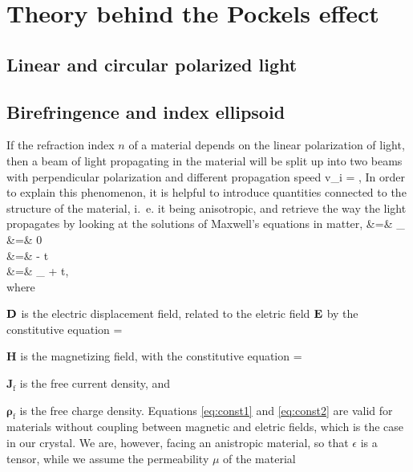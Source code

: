 \section{Theory behind the Pockels effect}

\subsection{Linear and circular polarized light}

\subsection{Birefringence and index ellipsoid}
If the refraction index $n$ of a material depends on the linear polarization of light, 
then a beam of light propagating in the material will be split up into 
two beams with perpendicular polarization and different propagation speed 
\beq
   v_i = , 
\eeq
In order to explain this phenomenon, it is helpful to introduce quantities 
connected to the structure of the material, i.~e. it being anisotropic, 
and retrieve the way the light propagates by looking at the solutions 
of Maxwell's equations in matter, 
\bea
\nabla \cdot {} &=& \rho_ 
\label{eq:max1} \\ 
\nabla \cdot {} &=& 0
\label{eq:max2} \\ 
\nabla \times {} &=& - {\partial t}
\label{eq:max3} \\ 
    \nabla \times {} &=& _ + 
         {\partial t}, 
\label{eq:max4} \\ 
\eea
where 
\bit
\item $\mathbf{D}$ is the electric displacement field, related to the eletric field $\mathbf{E}$ 
    by the constitutive equation 
    \beq
        \D = \epsilon \E 
    \label{eq:const1}
    \eeq
\item $\mathbf{H}$ is the magnetizing field, with the constitutive equation 
    \beq
         = \mu \B
    \label{eq:const2}
    \eeq
\item $\mathbf{J}_\text{f}$ is the free current density, and
\item $\mathbf{\rho}_\text{f}$ is the free charge density.
\eit
Equations \eqref{eq:const1} and \eqref{eq:const2} are valid for materials without 
coupling between magnetic and eletric fields, which is the case in our 
crystal. We are, however, facing an anistropic material, so that 
$\epsilon$ is a tensor, while we assume the permeability $\mu$ of the material 

